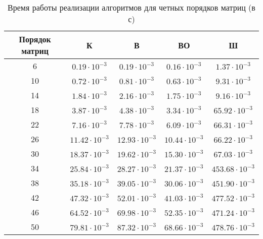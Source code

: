 \begin{table}[h]
	\begin{center}
		\begin{threeparttable}
			\captionsetup{justification=raggedright,singlelinecheck=off}
			\caption{Время работы реализации алгоритмов для четных порядков матриц (в с)}
			\label{tbl:time_measurements_even}
			\begin{tabular}{|c|c|c|c|c|}
				\hline
				Порядок матриц & К & В & ВО & Ш \\
				\hline
				6 &$ 0.19\cdot 10^{-3} $&$ 0.19\cdot 10^{-3} $&$ 0.16\cdot 10^{-3} $&$ 1.37\cdot 10^{-3}$\\
				\hline
				10 &$ 0.72\cdot 10^{-3} $&$ 0.81\cdot 10^{-3} $&$ 0.63\cdot 10^{-3} $&$ 9.31\cdot 10^{-3}$\\
				\hline
				14 &$ 1.84\cdot 10^{-3} $&$ 2.16\cdot 10^{-3} $&$ 1.75\cdot 10^{-3} $&$ 9.16\cdot 10^{-3}$\\
				\hline
				18 &$ 3.87\cdot 10^{-3} $&$ 4.38\cdot 10^{-3} $&$ 3.34\cdot 10^{-3} $&$ 65.92\cdot 10^{-3}$\\
				\hline
				22 &$ 7.16\cdot 10^{-3} $&$ 7.78\cdot 10^{-3} $&$ 6.09\cdot 10^{-3} $&$ 66.31\cdot 10^{-3}$\\
				\hline
				26 &$ 11.42\cdot 10^{-3} $&$ 12.93\cdot 10^{-3} $&$ 10.44\cdot 10^{-3} $&$ 66.22\cdot 10^{-3}$\\
				\hline
				30 &$ 18.37\cdot 10^{-3} $&$ 19.62\cdot 10^{-3} $&$ 15.30\cdot 10^{-3} $&$ 67.03\cdot 10^{-3}$\\
				\hline
				34 &$ 25.84\cdot 10^{-3} $&$ 28.27\cdot 10^{-3} $&$ 21.37\cdot 10^{-3} $&$ 453.68\cdot 10^{-3}$\\
				\hline
				38 &$ 35.18\cdot 10^{-3} $&$ 39.05\cdot 10^{-3} $&$ 30.06\cdot 10^{-3} $&$ 451.90\cdot 10^{-3}$\\
				\hline
				42 &$ 47.32\cdot 10^{-3} $&$ 52.01\cdot 10^{-3} $&$ 41.03\cdot 10^{-3} $&$ 477.52\cdot 10^{-3}$\\
				\hline
				46 &$ 64.52\cdot 10^{-3} $&$ 69.98\cdot 10^{-3} $&$ 52.35\cdot 10^{-3} $&$ 471.24\cdot 10^{-3}$\\
				\hline
				50 &$ 79.81\cdot 10^{-3} $&$ 87.32\cdot 10^{-3} $&$ 68.66\cdot 10^{-3} $&$ 478.76\cdot 10^{-3}$\\
				\hline
			\end{tabular}
		\end{threeparttable}
	\end{center}
\end{table}

